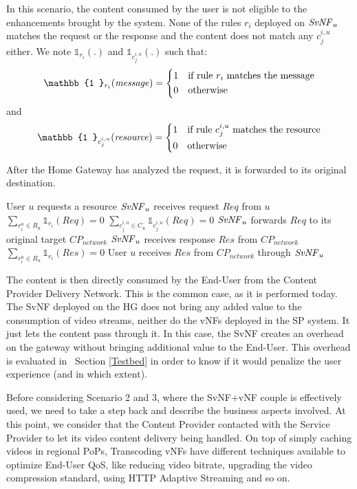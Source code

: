 In this scenario, the content consumed by the user is not eligible to the enhancements brought by the system. None of the rules $r_{i}$ deployed on $\mathit{SvNF}_{u}$ matches the request or the response and the content does not match any $c^{i,u}_{j}$ either. We note $\mathbb{1}_{r_{i}}(.)$ and $\mathbb{1}_{c^{i,u}_{j}}(.)$ such that:
\[
    \mathbb{1 }_{r_{i}}(\mathit{message})= 
\begin{dcases}
    1& \text{if rule $r_{i}$ matches the message} \\
    0              & \text{otherwise}
\end{dcases}
\]
and 
\[
    \mathbb{1 }_{c^{i,u}_{j}}(\mathit{resource})= 
\begin{dcases}
    1& \text{if rule $c^{i,u}_{j}$ matches the resource} \\
    0              & \text{otherwise}
\end{dcases}
\]

After the Home Gateway has analyzed the request, it is forwarded to its original destination.

\begin{algorithmic}[1]
	
\STATE User $u$ requests a resource
\STATE $\mathit{SvNF}_{u}$ receives request $\mathit{Req}$ from $u$
\STATE \( \sum_{r^{u}_{i}\in R_{u}}{\mathbb{1}_{r_{i}}(\mathit{Req})}=0 \)
\STATE \( \sum_{c^{i,u}_{j}\in C_{u}}{\mathbb{1}_{c^{i,u}_{j}}(\mathit{Req})}=0 \)
\STATE $\mathit{SvNF}_{u}$ forwards $\mathit{Req}$ to its original target \(\mathit{CP}_{\mathit{network}}\)
\STATE $\mathit{SvNF}_{u}$ receives response $\mathit{Res}$ from \(\mathit{CP}_{\mathit{network}}\)
\STATE \( \sum_{r^{u}_{i}\in R_{u}}{\mathbb{1}_{r_{i}}(\mathit{Res})}=0 \)
\STATE User $u$ receives $\mathit{Res}$ from \(\mathit{CP}_{\mathit{network}}\) through $\mathit{SvNF}_{u}$
\end{algorithmic}


The content is then directly consumed by the End-User from the Content Provider Delivery Network.
This is the common case, as it is performed today. The SvNF deployed on the HG does not bring any added value to the consumption of video streams, neither do the vNFs deployed in the SP system. It just lets the content pass through it.
In this case, the SvNF creates an overhead on the gateway without bringing additional value to the End-User.
This overhead is evaluated in ~Section \ref{Testbed} in order to know if it would penalize the user experience (and in which extent).

Before considering Scenario 2 and 3, where the SvNF+vNF couple is effectively used, we need to take a step back and describe the business aspects involved. At this point, we consider that the Content Provider contacted with the Service Provider to let its video content delivery being handled. On top of simply caching videos in regional PoPs, Transcoding vNFs have different techniques available to optimize End-User QoS, like reducing video bitrate, upgrading the video compression standard, using HTTP Adaptive Streaming and so on.

